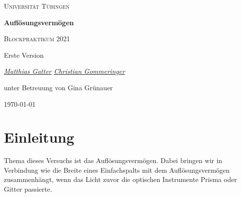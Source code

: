 \documentclass[a4paper, 12pt]{scrartcl}
\begin{document}
\begin{titlepage}
	\centering
	{\scshape\LARGE Universität Tübingen \par}
	\vspace{2cm}
	{\huge\bfseries Auflösungsvermögen \par}
	\vspace{2cm}
	{\Large \scshape Blockpraktikum 2021} \par
	\vspace{2cm}
	{\Large  Erste Version} \par
	\vspace{2cm}
	{\Large\itshape \underline{Matthias Gatter} \space \space  \underline{Christian Gommeringer}\par}
	\vfill 
	{\large unter Betreuung von Gina Grünauer }
	\vfill

	{\large \today\par}
\end{titlepage}
\newpage 
\tableofcontents 

\newpage
\section{Einleitung}
\begin{flushleft}
Thema dieses Versuchs ist das Auflösungsvermögen. Dabei bringen wir in Verbindung wie die Breite eines Einfachspalts mit dem Auflösungsvermögen zusammenhängt, wenn das Licht zuvor die optischen Instrumente Prisma oder Gitter passierte.



\end{flushleft}
\end{document}
